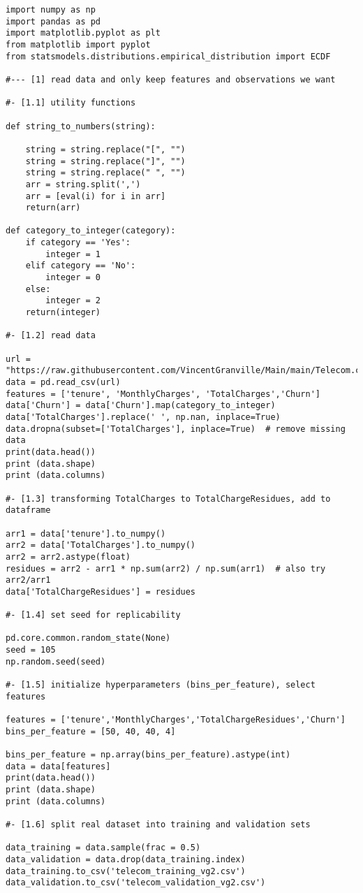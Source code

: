 \documentclass[oneside,10pt]{book}
\begin{document}
\begin{lstlisting}
import numpy as np
import pandas as pd
import matplotlib.pyplot as plt
from matplotlib import pyplot
from statsmodels.distributions.empirical_distribution import ECDF

#--- [1] read data and only keep features and observations we want

#- [1.1] utility functions

def string_to_numbers(string):

    string = string.replace("[", "")
    string = string.replace("]", "")
    string = string.replace(" ", "")
    arr = string.split(',')
    arr = [eval(i) for i in arr]
    return(arr)

def category_to_integer(category):
    if category == 'Yes':
        integer = 1
    elif category == 'No':
        integer = 0
    else:
        integer = 2
    return(integer)

#- [1.2] read data

url = "https://raw.githubusercontent.com/VincentGranville/Main/main/Telecom.csv"
data = pd.read_csv(url)
features = ['tenure', 'MonthlyCharges', 'TotalCharges','Churn'] 
data['Churn'] = data['Churn'].map(category_to_integer) 
data['TotalCharges'].replace(' ', np.nan, inplace=True)
data.dropna(subset=['TotalCharges'], inplace=True)  # remove missing data
print(data.head()) 
print (data.shape)
print (data.columns)

#- [1.3] transforming TotalCharges to TotalChargeResidues, add to dataframe

arr1 = data['tenure'].to_numpy()
arr2 = data['TotalCharges'].to_numpy() 
arr2 = arr2.astype(float)
residues = arr2 - arr1 * np.sum(arr2) / np.sum(arr1)  # also try arr2/arr1
data['TotalChargeResidues'] = residues

#- [1.4] set seed for replicability

pd.core.common.random_state(None)
seed = 105
np.random.seed(seed)

#- [1.5] initialize hyperparameters (bins_per_feature), select features

features = ['tenure','MonthlyCharges','TotalChargeResidues','Churn'] 
bins_per_feature = [50, 40, 40, 4]   

bins_per_feature = np.array(bins_per_feature).astype(int)
data = data[features]
print(data.head())
print (data.shape)
print (data.columns)

#- [1.6] split real dataset into training and validation sets

data_training = data.sample(frac = 0.5)
data_validation = data.drop(data_training.index)
data_training.to_csv('telecom_training_vg2.csv')
data_validation.to_csv('telecom_validation_vg2.csv')


\end{lstlisting}
\end{document}
